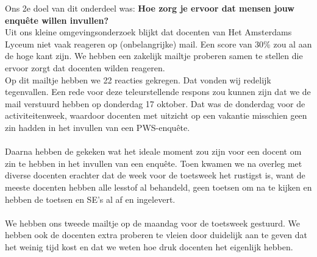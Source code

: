 \documentclass[12pt]{article}
\begin{document}
\begin{multicols}{2}
Ons 2e doel van dit onderdeel was: \textbf{Hoe zorg je ervoor dat mensen jouw enquête willen invullen?}\\
Uit ons kleine omgevingsonderzoek blijkt dat docenten van Het Amsterdams Lyceum niet vaak reageren op (onbelangrijke) mail. Een score van 30\% zou al aan de hoge kant zijn. We hebben een zakelijk mailtje proberen samen te stellen die ervoor zorgt dat docenten wilden reageren. \\
Op dit mailtje hebben we 22 reacties gekregen. Dat vonden wij redelijk tegenvallen.
Een rede voor deze teleurstellende respons zou kunnen zijn dat we de mail verstuurd hebben op donderdag 17 oktober. Dat was de donderdag voor de activiteitenweek, waardoor docenten met uitzicht op een vakantie misschien geen zin hadden in het invullen van een PWS-enquête.\\
\\
Daarna hebben de gekeken wat het ideale moment zou zijn voor een docent om zin te hebben in het invullen van een enquête. Toen kwamen we na overleg met diverse docenten erachter dat de week voor de toetsweek het rustigst is, want de meeste docenten hebben alle lesstof al behandeld, geen toetsen om na te kijken en hebben de toetsen en SE's al af en ingelevert.  \\
\\
We hebben ons tweede mailtje op de maandag voor de toetsweek gestuurd. We hebben ook de docenten extra proberen te vleien door duidelijk aan te geven dat het weinig tijd kost en dat we weten hoe druk docenten het eigenlijk hebben.
\fbox{\begin{minipage}{\linewidth}
    

\end{minipage}}
\end{multicols}
\end{document}
